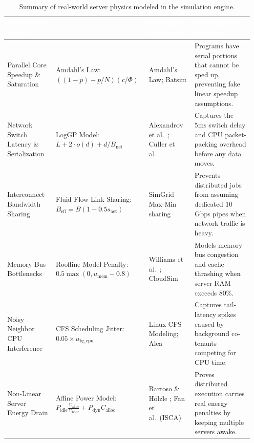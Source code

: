 \documentclass[11pt,a4paper]{article}
\begin{document}
\begin{table}[tbp]
\centering
\footnotesize
\renewcommand{\arraystretch}{1.3}
\begin{tabularx}{\textwidth}{p{2.8cm} p{3.7cm} p{3.2cm} X}
\toprule
\rowcolor{tableheader}
\textcolor{white}{\textbf{Real-World Effect}} & \textcolor{white}{\textbf{Simulator Formula}} & \textcolor{white}{\textbf{Literature Standard}} & \textcolor{white}{\textbf{Plain-English Defense}} \\
\midrule
Parallel Core Speedup \& Saturation &
Amdahl's Law: \newline $((1-p) + p/N)(c/\Phi)$ &
Amdahl's Law; \newline Batsim \cite{dutot2016batsim} &
Programs have serial portions that cannot be sped up, preventing fake linear speedup assumptions. \\
\rowcolor{altrow}
Network Switch Latency \& Serialization &
LogGP Model: \newline $L + 2\cdot o(d) + d/B_{\text{net}}$ &
Alexandrov et al.\ \cite{alexandrov1995loggp}; \newline Culler et al.\ \cite{culler1993logp} &
Captures the $5\text{ms}$ switch delay and CPU packet-packing overhead before any data moves. \\
Interconnect Bandwidth Sharing &
Fluid-Flow Link Sharing: \newline $B_{\text{eff}} = B(1 - 0.5 s_{\text{net}})$ &
SimGrid Max-Min sharing \cite{casanova2014simgrid} &
Prevents distributed jobs from assuming dedicated 10 Gbps pipes when network traffic is heavy. \\
\rowcolor{altrow}
Memory Bus Bottlenecks &
Roofline Model Penalty: \newline $0.5 \max(0, u_{\text{mem}} - 0.8)$ &
Williams et al.\ \cite{williams2009roofline}; \newline CloudSim \cite{calheiros2011cloudsim} &
Models memory bus congestion and cache thrashing when server RAM exceeds $80\%$. \\
Noisy Neighbor CPU Interference &
CFS Scheduling Jitter: \newline $0.05 \times u_{\text{bg\_cpu}}$ &
Linux CFS Modeling; \newline Alea \cite{klusacek2010alea} &
Captures tail-latency spikes caused by background co-tenants competing for CPU time. \\
\rowcolor{altrow}
Non-Linear Server Energy Drain &
Affine Power Model: \newline $P_{\text{idle}}\frac{C_{\text{alloc}}}{C_{\text{node}}} + P_{\text{dyn}}C_{\text{alloc}}$ &
Barroso \& H{\"o}lzle \cite{barroso2007power}; \newline Fan et al.\ (ISCA) \cite{fan2007power} &
Proves distributed execution carries real energy penalties by keeping multiple servers awake. \\
\bottomrule
\end{tabularx}
\caption{Summary of real-world server physics modeled in the simulation engine.}
\label{tab:defense_matrix}
\end{table}
\end{document}
